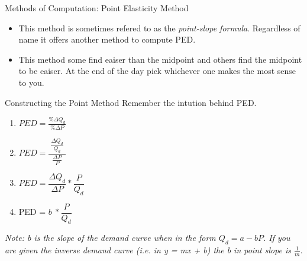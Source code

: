 \documentclass[aspectratio=169]{beamer}
\begin{document}
\begin{frame}{Methods of Computation: Point Elasticity Method}
    \begin{itemize}
        \item This method is sometimes refered to as the \textit{point-slope formula}. Regardless of name it offers another method to compute PED.
        \vspace{5mm}
        \item This method some find eaiser than the midpoint and others find the midpoint to be eaiser. At the end of the day pick whichever one makes the most sense to you.
    \end{itemize}
\end{frame}

\begin{frame}{Constructing the Point Method}
    Remember the intution behind PED.
    \vspace{5mm}
    \begin{enumerate}
        \item $ PED = \frac{\% \Delta Q_d}{\% \Delta P} $
        \vspace{5mm}
        \item $ PED =  \dfrac{~\frac{\Delta Q_d}{Q_d}~}{\frac{\Delta P}{P}}$
        \vspace{5mm}
        \item $ PED =  \dfrac{\Delta Q_d}{\Delta P} * \dfrac{P}{Q_d}$
        \vspace{5mm}
        \item PED = $ b ~ * \dfrac{P}{Q_d} $
    \end{enumerate}
    \textit{Note: b is the slope of the demand curve when in the form $Q_d = a - bP $. If you are given the inverse demand curve (i.e. in y = mx + b) the b in point slope is $ \frac{1}{m}$}.
\end{frame}
\end{document}
